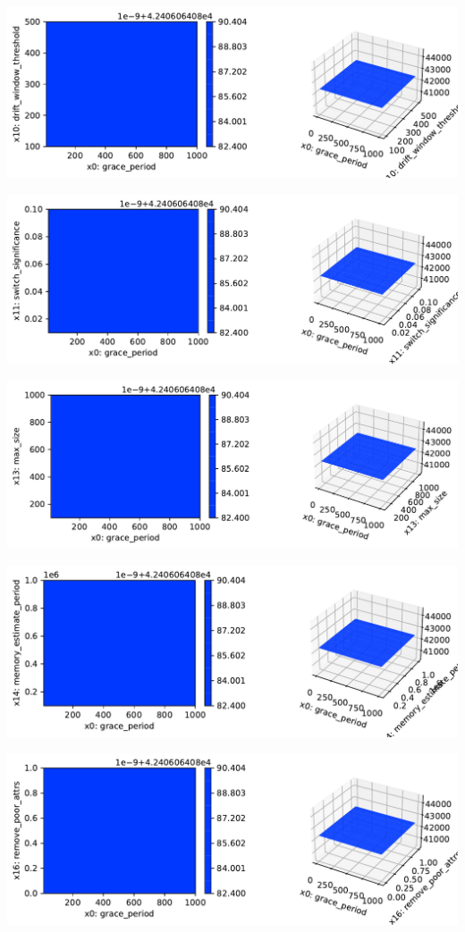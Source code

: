 \documentclass[
  letterpaper,
  DIV=11,
  numbers=noendperiod]{scrreprt}
\begin{document}
\includegraphics{024_spot_hpt_river_friedman_hatr_files/figure-pdf/cell-42-output-10.pdf}

\includegraphics{024_spot_hpt_river_friedman_hatr_files/figure-pdf/cell-42-output-11.pdf}

\includegraphics{024_spot_hpt_river_friedman_hatr_files/figure-pdf/cell-42-output-12.pdf}

\includegraphics{024_spot_hpt_river_friedman_hatr_files/figure-pdf/cell-42-output-13.pdf}

\includegraphics{024_spot_hpt_river_friedman_hatr_files/figure-pdf/cell-42-output-14.pdf}
\end{document}
